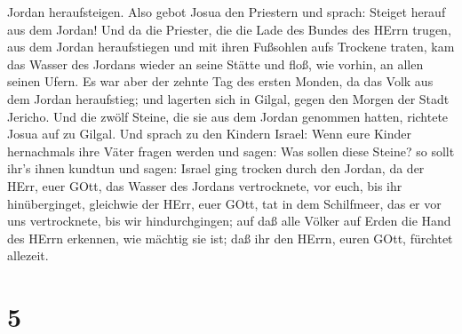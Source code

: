 Jordan heraufsteigen.  Also gebot Josua den Priestern und
sprach: Steiget herauf aus dem Jordan!  Und da die
Priester, die die Lade des Bundes des HErrn trugen, aus dem Jordan
heraufstiegen und mit ihren Fußsohlen aufs Trockene traten, kam das
Wasser des Jordans wieder an seine Stätte und floß, wie vorhin, an allen
seinen Ufern.  Es war aber der zehnte Tag des ersten
Monden, da das Volk aus dem Jordan heraufstieg; und lagerten sich in
Gilgal, gegen den Morgen der Stadt Jericho.  Und die zwölf
Steine, die sie aus dem Jordan genommen hatten, richtete Josua auf zu
Gilgal.  Und sprach zu den Kindern Israel: Wenn eure Kinder
hernachmals ihre Väter fragen werden und sagen: Was sollen diese Steine?
 so sollt ihr's ihnen kundtun und sagen: Israel ging
trocken durch den Jordan,  da der HErr, euer GOtt, das
Wasser des Jordans vertrocknete, vor euch, bis ihr hinüberginget,
gleichwie der HErr, euer GOtt, tat in dem Schilfmeer, das er vor uns
vertrocknete, bis wir hindurchgingen;  auf daß alle Völker
auf Erden die Hand des HErrn erkennen, wie mächtig sie ist; daß ihr den
HErrn, euren GOtt, fürchtet allezeit.

\hypertarget{section-4}{%
\section{5}\label{section-4}}

